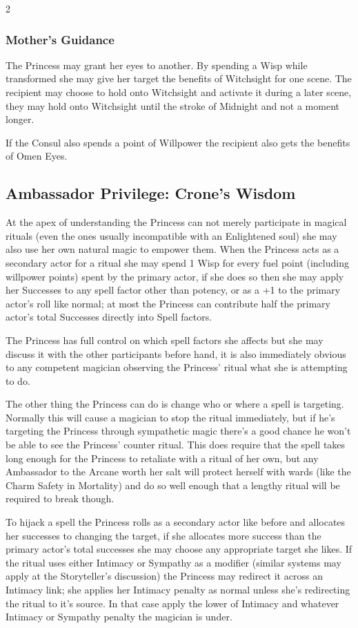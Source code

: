\begin{multicols}{2}
\subsubsection*{Mother's Guidance}

The Princess may grant her eyes to another. By spending a Wisp while transformed she may give her target the benefits of Witchsight for one scene. The recipient may choose to hold onto Witchsight and activate it during a later scene, they may hold onto Witchsight until the stroke of Midnight and not a moment longer. 

If the Consul also spends a point of Willpower the recipient also gets the benefits of Omen Eyes. 

\subsection*{Ambassador Privilege: Crone's Wisdom}

At the apex of understanding the Princess can not merely participate in magical rituals (even the ones usually incompatible with an Enlightened soul) she may also use her own natural magic to empower them. When the Princess acts as a secondary actor for a ritual she may spend 1 Wisp for every fuel point (including willpower points) spent by the primary actor, if she does so then she may apply her Successes to any spell factor other than potency, or as a +1 to the primary actor's roll like normal; at most the Princess can contribute half the primary actor’s total Successes directly into Spell factors. 

The Princess has full control on which spell factors she affects but she may discuss it with the other participants before hand, it is also immediately obvious to any competent magician observing the Princess' ritual what she is attempting to do. 

The other thing the Princess can do is change who or where a spell is targeting. Normally this will cause a magician to stop the ritual immediately, but if he's targeting the Princess through sympathetic magic there's a good chance he won't be able to see the Princess' counter ritual. This does require that the spell takes long enough for the Princess to retaliate with a ritual of her own, but any Ambassador to the Arcane worth her salt will protect herself with wards (like the Charm Safety in Mortality) and do so well enough that a lengthy ritual will be required to break though. 

To hijack a spell the Princess rolls as a secondary actor like before and allocates her successes to changing the target, if she allocates more success than the primary actor's total successes she may choose any appropriate target she likes. If the ritual uses either Intimacy or Sympathy as a modifier (similar systems may apply at the Storyteller's discussion) the Princess may redirect it across an Intimacy link; she applies her Intimacy penalty as normal unless she's redirecting the ritual to it's source. In that case apply the lower of Intimacy and whatever Intimacy or Sympathy penalty the magician is under. 


\end{multicols}
